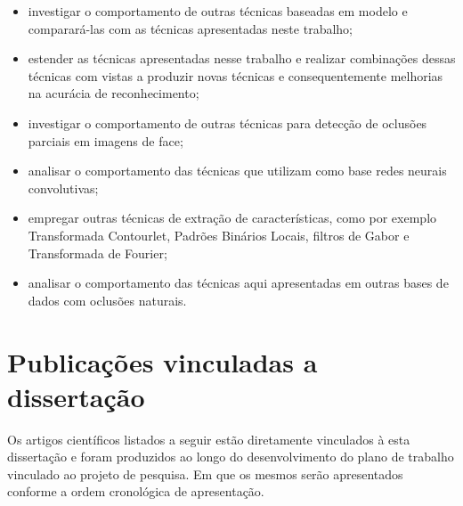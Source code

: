 \begin{itemize}
\item investigar o comportamento de outras técnicas baseadas em modelo e comparará-las com as técnicas apresentadas neste trabalho;
\item estender as técnicas apresentadas nesse trabalho e realizar combinações dessas técnicas com vistas a produzir novas técnicas e consequentemente melhorias na acurácia de reconhecimento;
\item investigar o comportamento de outras técnicas para detecção de oclusões parciais em imagens de face;	
\item analisar o comportamento das técnicas que utilizam como base redes neurais convolutivas;
\item empregar outras técnicas de extração de características, como por exemplo Transformada Contourlet, Padrões Binários Locais, filtros de Gabor e Transformada de Fourier; 
\item analisar o comportamento das técnicas aqui apresentadas em outras bases de dados com oclusões naturais.
\end{itemize}

\section{Publicações vinculadas a dissertação}

Os artigos científicos listados a seguir estão diretamente vinculados à esta dissertação e foram produzidos ao longo do desenvolvimento do plano de trabalho vinculado ao projeto de pesquisa. Em que os mesmos serão apresentados conforme a ordem cronológica de apresentação.


